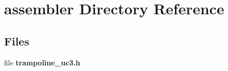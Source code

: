\section{assembler Directory Reference}
\label{dir_b56a8db23c35bf9da7f760b418b0fcbd}
\subsection*{Files}
\begin{DoxyCompactItemize}
\item 
file {\bfseries trampoline\+\_\+uc3.\+h}
\end{DoxyCompactItemize}
